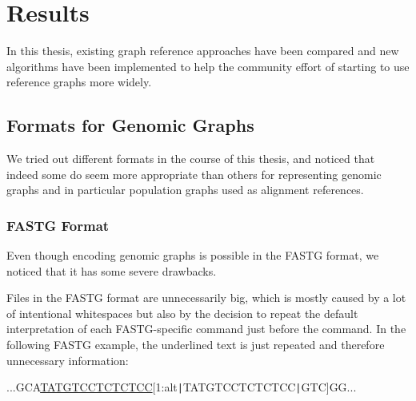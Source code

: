 \documentclass[a4paper,12pt,twoside,BCOR=10mm]{scrbook}
\def\pipe{\texttt{|}}
\begin{document}
\chapter{Results}
%

In this thesis, existing graph reference approaches have been compared 
and new algorithms have been implemented to help the community effort 
of starting to use reference graphs more widely.

\section{Formats for Genomic Graphs}
\label{sec:results_data_formats}
%

We tried out different formats in the course of this thesis, 
and noticed that indeed some do seem more appropriate than others 
for representing genomic graphs 
and in particular population graphs used as alignment references.

\subsection{FASTG Format}

Even though encoding genomic graphs is possible in the FASTG format, 
we noticed that it has some severe drawbacks.

Files in the FASTG format are unnecessarily big, which is mostly caused 
by a lot of intentional whitespaces but also by the decision to repeat the 
default interpretation of each FASTG-specific command just before the command. 
In the following FASTG example, the underlined 
text is just repeated and therefore unnecessary information:

...GCA\underline{TATGTCCTCTCTCC}[1:alt\pipe TATGTCCTCTCTCC\pipe GTC]GG...
\end{document}
